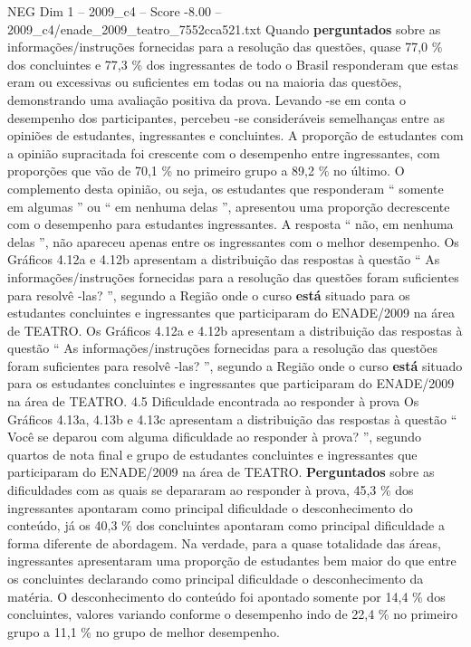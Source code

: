 \begin{textsample}{NEG Dim 1 – 2009\_c4 – Score -8.00 – 2009\_c4/enade\_2009\_teatro\_7552cca521.txt}
Quando \textbf{perguntados} sobre as informações/instruções fornecidas para a resolução das questões, quase 77,0 \% dos concluintes e 77,3 \% dos ingressantes de todo o Brasil responderam que estas eram ou excessivas ou suficientes em todas ou na maioria das questões, demonstrando uma avaliação positiva da prova.
Levando -se em conta o desempenho dos participantes, percebeu -se consideráveis semelhanças entre as opiniões de estudantes, ingressantes e concluintes.
A proporção de estudantes com a opinião supracitada foi crescente com o desempenho entre ingressantes, com proporções que vão de 70,1 \% no primeiro grupo a 89,2 \% no último.
O complemento desta opinião, ou seja, os estudantes que responderam “ somente em algumas ” ou “ em nenhuma delas ”, apresentou uma proporção decrescente com o desempenho para estudantes ingressantes.
A resposta “ não, em nenhuma delas ”, não apareceu apenas entre os ingressantes com o melhor desempenho.
Os Gráficos 4.12a e 4.12b apresentam a distribuição das respostas à questão “ As informações/instruções fornecidas para a resolução das questões foram suficientes para resolvê -las? ”, segundo a Região onde o curso \textbf{está} situado para os estudantes concluintes e ingressantes que participaram do ENADE/2009 na área de TEATRO.
Os Gráficos 4.12a e 4.12b apresentam a distribuição das respostas à questão “ As informações/instruções fornecidas para a resolução das questões foram suficientes para resolvê -las? ”, segundo a Região onde o curso \textbf{está} situado para os estudantes concluintes e ingressantes que participaram do ENADE/2009 na área de TEATRO. 4.5 Dificuldade encontrada ao responder à prova Os Gráficos 4.13a, 4.13b e 4.13c apresentam a distribuição das respostas à questão “ Você se deparou com alguma dificuldade ao responder à prova? ”, segundo quartos de nota final e grupo de estudantes concluintes e ingressantes que participaram do ENADE/2009 na área de TEATRO. \textbf{Perguntados} sobre as dificuldades com as quais se depararam ao responder à prova, 45,3 \% dos ingressantes apontaram como principal dificuldade o desconhecimento do conteúdo, já os 40,3 \% dos concluintes apontaram como principal dificuldade a forma diferente de abordagem.
Na verdade, para a quase totalidade das áreas, ingressantes apresentaram uma proporção de estudantes bem maior do que entre os concluintes declarando como principal dificuldade o desconhecimento da matéria.
O desconhecimento do conteúdo foi apontado somente por 14,4 \% dos concluintes, valores variando conforme o desempenho indo de 22,4 \% no primeiro grupo a 11,1 \% no grupo de melhor desempenho.

\end{textsample}
